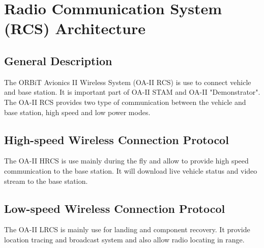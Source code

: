 \documentclass[12pt,article]{memoir}
\begin{document}
\newpage

\chapter{Radio Communication System (RCS) Architecture}
\section{General Description}
The ORBiT Avionics II Wireless System (OA-II RCS) is use to connect vehicle and base station. It is important part of OA-II STAM and OA-II "Demonstrator". The OA-II RCS provides two type of communication between the vehicle and base station, high speed and low power modes.
\section{High-speed Wireless Connection Protocol}
The OA-II HRCS is use mainly during the fly and allow to provide high speed communication to the base station. It will download live vehicle status and video stream to the base station.
\section{Low-speed Wireless Connection Protocol}
The OA-II LRCS is mainly use for landing and component recovery. It provide location tracing and broadcast system and also allow radio locating in range.


\end{document}
